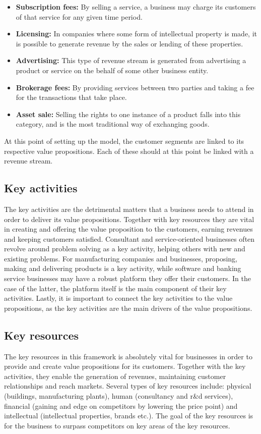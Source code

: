 \begin{itemize}
    \item \textbf{Subscription fees: }By selling a service, a business may charge its customers of that service for any given time period. 
    \item \textbf{Licensing: }In companies where some form of intellectual property is made, it is possible to generate revenue by the sales or lending of these properties.
    \item \textbf{Advertising: }This type of revenue stream is generated from advertising a product or service on the behalf of some other business entity.
    \item \textbf{Brokerage fees: }By providing services between two parties and taking a fee for the transactions that take place.
    \item \textbf{Asset sale: }Selling the rights to one instance of a product falls into this category, and is the most traditional way of exchanging goods.
\end{itemize}

At this point of setting up the model, the customer segments are linked to its respective value propositions. Each of these should at this point be linked with a revenue stream.

\subsection{Key activities}
The key activities are the detrimental matters that a business needs to attend in order to deliver its value propositions. Together with key resources they are vital in creating and offering the value proposition to the customers, earning revenues and keeping customers satisfied. Consultant and service-oriented businesses often revolve around problem solving as a key activity, helping others with new and existing problems. For manufacturing companies and businesses, proposing, making and delivering products is a key activity, while software and banking service businesses may have a robust platform they offer their customers. In the case of the latter, the platform itself is the main component of their key activities. Lastly, it is important to connect the key activities to the value propositions, as the key activities are the main drivers of the value propositions.

\subsection{Key resources}
The key resources in this framework is absolutely vital for businesses in order to provide and create value propositions for its customers. Together with the key activities, they enable the generation of revenues, maintaining customer relationships and reach markets. Several types of key resources include:  physical (buildings, manufacturing plants), human (consultancy and r\&d services), financial (gaining and edge on competitors by lowering the price point) and intellectual (intellectual properties, brands etc.). The goal 
of the key resources is for the business to surpass competitors on key areas of the key resources.

